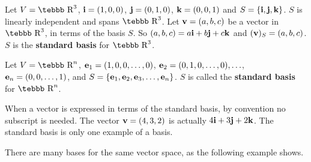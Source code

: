 \begin{example}
\label{exam5.basisR3}

Let $V=\mbox{\tebbb R}^3$, ${\bf i}=(1,0,0)$, ${\bf j}=(0,1,0)$,
${\bf k}=(0,0,1)$ and $S=\{{\bf i,j,k}\}$.  $S$ is linearly
independent and spans $\mbox{\tebbb R}^3$.  Let ${\bf v}= (a,b,c)$
be a vector in $\mbox{\tebbb R}^3$, in terms of the basis $S$.  So
$(a,b,c)=a{\bf i}+b{\bf j}+c{\bf k}$ and $({\bf v})_S=(a,b,c)$.
$S$ is the {\bf standard basis} for $\mbox{\tebbb R}^3$.
\end{example}

\begin{example}
\label{exam5.basisRn}

Let $V=\mbox{\tebbb R}^n$, ${\bf e}_1=(1,0,0,\ldots,0)$, ${\bf
e}_2=(0,1,0,\ldots,0), \ldots$, ${\bf e}_n=(0,0,\ldots,1)$, and
$S=\{ {\bf e}_1,{\bf e}_2,{\bf e}_3,\ldots, {\bf e}_n\}$.  $S$ is
called the {\bf standard basis} for $\mbox{\tebbb R}^n$.
\end{example}

\noindent When a vector is expressed in terms of the standard
basis, by convention no subscript is needed.  The vector ${\bf
v}=(4,3,2)$ is actually $4{\bf i}+3{\bf j}+2{\bf k}$. The standard
basis is only one example of a basis.

There are many bases for the same vector space, as the following
example shows.

